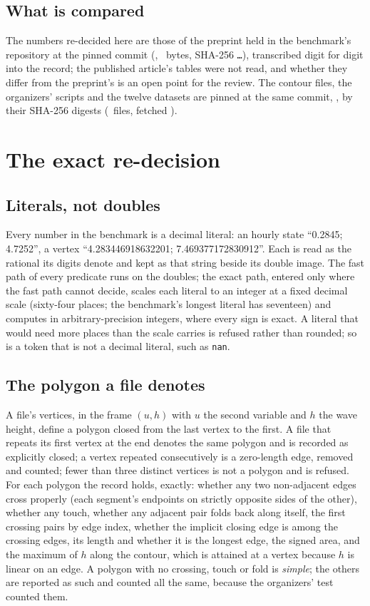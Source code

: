 \documentclass[preprint,11pt,authoryear]{elsarticle}
\begin{document}
\subsection{What is compared}
The numbers re-decided here are those of the preprint held in the benchmark's repository at the pinned commit (\texttt{\EPaperFile}, \EPaperBytes\ bytes, SHA-256 \texttt{\EPaperSha\ldots}), transcribed digit for digit into the record; the published article's tables were not read, and whether they differ from the preprint's is an open point for the review. The contour files, the organizers' scripts and the twelve datasets are pinned at the same commit, \texttt{\ECommit}, by their SHA-256 digests (\ECorpusFiles\ files, fetched \EFetched).

\section{The exact re-decision}\label{sec:method}

\subsection{Literals, not doubles}
Every number in the benchmark is a decimal literal: an hourly state ``0.2845; 4.7252'', a vertex ``4.283446918632201; 7.469377172830912''. Each is read as the rational its digits denote and kept as that string beside its double image. The fast path of every predicate runs on the doubles; the exact path, entered only where the fast path cannot decide, scales each literal to an integer at a fixed decimal scale (sixty-four places; the benchmark's longest literal has seventeen) and computes in arbitrary-precision integers, where every sign is exact. A literal that would need more places than the scale carries is refused rather than rounded; so is a token that is not a decimal literal, such as \texttt{nan}.

\subsection{The polygon a file denotes}
A file's vertices, in the frame $(u, h)$ with $u$ the second variable and $h$ the wave height, define a polygon closed from the last vertex to the first. A file that repeats its first vertex at the end denotes the same polygon and is recorded as explicitly closed; a vertex repeated consecutively is a zero-length edge, removed and counted; fewer than three distinct vertices is not a polygon and is refused. For each polygon the record holds, exactly: whether any two non-adjacent edges cross properly (each segment's endpoints on strictly opposite sides of the other), whether any touch, whether any adjacent pair folds back along itself, the first crossing pairs by edge index, whether the implicit closing edge is among the crossing edges, its length and whether it is the longest edge, the signed area, and the maximum of $h$ along the contour, which is attained at a vertex because $h$ is linear on an edge. A polygon with no crossing, touch or fold is \emph{simple}; the others are reported as such and counted all the same, because the organizers' test counted them.
\end{document}

